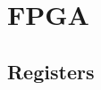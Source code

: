 \documentclass[a4paper,11pt]{report}
\begin{document}
\chapter{FPGA}

\section{Registers}

%             
%             
\end{document}
